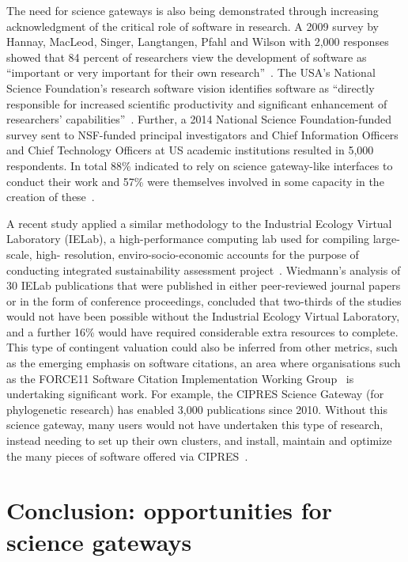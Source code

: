 \documentclass[review]{elsarticle}
\begin{document}
The need for science gateways is also being demonstrated through increasing acknowledgment of the critical role of software in research. A 2009 survey by Hannay, MacLeod, Singer, Langtangen, Pfahl and Wilson with 2,000 responses showed that 84 percent of researchers view the development of software as ``important or very important for their own research''~\cite{Hannay2009-36}. The USA's National Science Foundation's research software vision identifies software as ``directly responsible for increased scientific productivity and significant enhancement of researchers' capabilities''~\cite{nsf-si-17}. 
Further, a 2014 National Science Foundation-funded survey sent to NSF-funded principal investigators and Chief Information Officers and Chief Technology Officers at US academic institutions resulted in  5,000 respondents. In total 88\% indicated to rely on science gateway-like interfaces to conduct their work and 57\% were themselves involved in some capacity in the creation of these~\cite{Lawrence2015-37}.

A recent study applied a similar methodology to the Industrial Ecology Virtual Laboratory (IELab), a high-performance computing lab used for compiling large-scale, high- resolution, enviro-socio-economic accounts for the purpose of conducting integrated sustainability assessment project~\cite{Wiedmann2017-38}. 
Wiedmann's analysis of 30 IELab publications that were published in either peer-reviewed journal papers or in the form of conference proceedings, concluded that two-thirds of the studies would not have been possible without the Industrial Ecology Virtual Laboratory, and a further 16\% would have required considerable extra resources to complete. 
This type of contingent valuation could also be inferred from other metrics, such as the emerging emphasis on software citations, an area where organisations such as the FORCE11 Software Citation Implementation Working Group~\cite{force11-39} is undertaking significant work. For example, the CIPRES Science Gateway (for phylogenetic research) has enabled 3,000 publications since 2010. Without this science gateway, many users would not have undertaken this type of research, instead needing to set up their own clusters, and install, maintain and optimize the many pieces of software offered via CIPRES~\cite{Miller2012-40}. 

\section{Conclusion: opportunities for science gateways}
\end{document}
